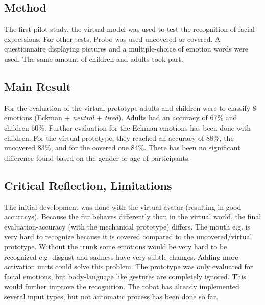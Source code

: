 \documentclass[smallheadings,english, DIV14]{scrartcl}
\begin{document}
\subsection*{Method}

The first pilot study, the virtual model was used to test the recognition of facial expressions. For other tests, Probo was used uncovered or covered. A questionnaire displaying pictures and a multiple-choice of emotion words were used. The same amount of children and adults took part.

\subsection*{Main Result}

For the evaluation of the virtual prototype adults and children were to classify 8 emotions (Eckman + \textit{neutral} + \textit{tired}). Adults had an accuracy of 67\% and children 60\%. Further evaluation for the Eckman emotions has been done with children. For the virtual prototype, they reached an accuracy of 88\%, the uncovered 83\%, and for the covered one 84\%. There has been no significant difference found based on the gender or age of participants.


\subsection*{Critical Reflection, Limitations}

The initial development was done with the virtual avatar (resulting in good accuracys). Because the fur behaves differently than in the virtual world, the final evaluation-accuracy (with the mechanical prototype) differs. The mouth e.g. is very hard to recognize because it is covered compared to the uncovered/virtual prototype. Without the trunk some emotions would be very hard to be recognized e.g. disgust and sadness have very subtle changes. Adding more activation units could solve this problem.
The prototype was only evaluated for facial emotions, but body-language like gestures are completely ignored. This would further improve the recognition.
The robot has already implemented several input types, but not automatic process has been done so far.

\clearpage
\end{document}
